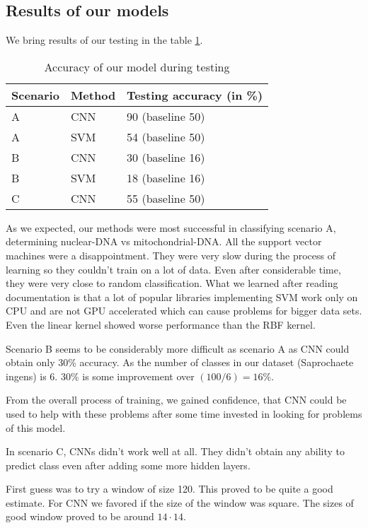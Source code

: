 \subsection{Results of our models}

We bring results of our testing in the table \ref{tab:mlResults}. 

\begin{table}
\caption[Accuracy of our model during testing]{Accuracy of our model during testing}
\label{tab:mlResults}
\begin{center}
\begin{tabular}{|l|l|l|}
\hline
Scenario & Method & Testing accuracy (in \%)\\
\hline
A & CNN & 90 (baseline 50)\\
A & SVM & 54 (baseline 50)\\
B & CNN & 30 (baseline 16)\\
B & SVM & 18 (baseline 16)\\
C & CNN & 55 (baseline 50)\\
\hline
\end{tabular}
\end{center}
\end{table}

As we expected, our methods were most successful in classifying scenario A, determining
nuclear-DNA vs mitochondrial-DNA. All the support vector machines were a disappointment.
They were very slow during the process of learning so they couldn't train on a lot of
data. Even after considerable time, they were very close to random classification.
What we learned after reading documentation is that a lot of popular libraries
implementing SVM work only on CPU and are not GPU accelerated which can cause
problems for bigger data sets. Even the linear kernel showed worse performance than the RBF kernel.

\medskip

Scenario B seems to be considerably more difficult as scenario A as CNN could obtain
only 30\% accuracy. As the number of classes in our dataset (Saprochaete ingens)
is 6. 30\% is some improvement over $(100/6)=16\%$.

From the overall process of training, we gained confidence, that CNN could
be used to help with these problems after some time invested in looking for
problems of this model.

\medskip

In scenario C, CNNs didn't work well at all. They didn't obtain any ability to predict
class even after adding some more hidden layers.

\medskip

First guess was to try a window of size 120. This proved to be quite a good estimate.
For CNN we favored if the size of the window was square. The sizes of good window
proved to be around $14\cdot 14$.

